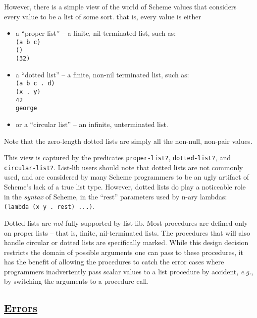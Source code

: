 However, there is a simple view of the world of Scheme values that
considers every value to be a list of some sort. that is, every value is
either

\begin{itemize}
\tightlist
\item
  a ``proper list'' -- a finite, nil-terminated list, such as:\\
  \texttt{(a\ b\ c)}\\
  \texttt{()}\\
  \texttt{(32)}\\
\item
  a ``dotted list'' -- a finite, non-nil terminated list, such as:\\
  \texttt{(a\ b\ c\ .\ d)}\\
  \texttt{(x\ .\ y)}\\
  \texttt{42}\\
  \texttt{george}\\
\item
  or a ``circular list'' -- an infinite, unterminated list.
\end{itemize}

Note that the zero-length dotted lists are simply all the non-null,
non-pair values.

This view is captured by the predicates \texttt{proper-list?},
\texttt{dotted-list?}, and \texttt{circular-list?}. List-lib users
should note that dotted lists are not commonly used, and are considered
by many Scheme programmers to be an ugly artifact of Scheme's lack of a
true list type. However, dotted lists do play a noticeable role in the
\emph{syntax} of Scheme, in the ``rest'' parameters used by n-ary
lambdas: \texttt{(lambda\ (x\ y\ .\ rest)\ ...)}.

Dotted lists are \emph{not} fully supported by list-lib. Most procedures
are defined only on proper lists -- that is, finite, nil-terminated
lists. The procedures that will also handle circular or dotted lists are
specifically marked. While this design decision restricts the domain of
possible arguments one can pass to these procedures, it has the benefit
of allowing the procedures to catch the error cases where programmers
inadvertently pass scalar values to a list procedure by accident,
\emph{e.g.}, by switching the arguments to a procedure call.

\subsection{\texorpdfstring{\href{}{Errors}}{Errors}}\label{errors}

